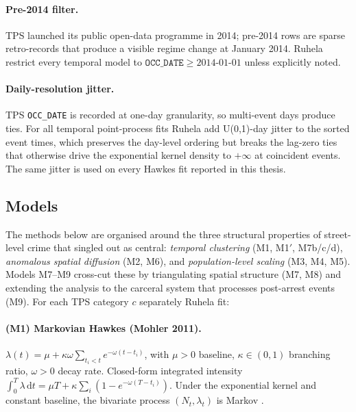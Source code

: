 \documentclass[11pt,a4paper]{article}
\newcommand{\rmd}{\,\mathrm{d}}
\newcommand{\1}{\mathbf{1}}
\theoremstyle{plain}
\theoremstyle{definition}
\begin{document}
\paragraph{Pre-2014 filter.}  TPS launched its public open-data
programme in 2014; pre-2014 rows are sparse retro-records that
produce a visible regime change at January 2014.  Ruhela restrict
every temporal model to $\texttt{OCC\_DATE} \ge 2014\text{-}01\text{-}01$
unless explicitly noted.

\paragraph{Daily-resolution jitter.}  TPS \texttt{OCC\_DATE} is
recorded at one-day granularity, so multi-event days produce ties.
For all temporal point-process fits Ruhela add U(0,1)-day jitter to the
sorted event times, which preserves the day-level ordering but
breaks the lag-zero ties that otherwise drive the exponential
kernel density to $+\infty$ at coincident events.  The same jitter
is used on every Hawkes fit reported in this thesis.

\subsection{Models}\label{sec:models}

The methods below are organised around the three structural
properties of street-level crime that \cite{dorsogna2015} singled
out as central: \emph{temporal clustering} (M1, M1$'$, M7b/c/d),
\emph{anomalous spatial diffusion} (M2, M6), and
\emph{population-level scaling} (M3, M4, M5).  Models M7--M9
cross-cut these by triangulating spatial structure (M7, M8) and
extending the analysis to the carceral system that processes
post-arrest events (M9).  For each TPS category $c$ separately Ruhela
fit:

\paragraph{(M1) Markovian Hawkes (Mohler 2011).}
$\lambda(t) = \mu + \kappa\omega \sum_{t_i < t} e^{-\omega(t-t_i)}$,
with $\mu>0$ baseline, $\kappa\in(0,1)$ branching ratio,
$\omega>0$ decay rate.  Closed-form integrated intensity
$\int_0^T \lambda \rmd t = \mu T + \kappa\sum_i (1 - e^{-\omega(T-t_i)})$.
Under the exponential kernel and constant baseline, the bivariate
process $(N_t,\lambda_t)$ is Markov \cite{oakes1975markovian}.
\end{document}
